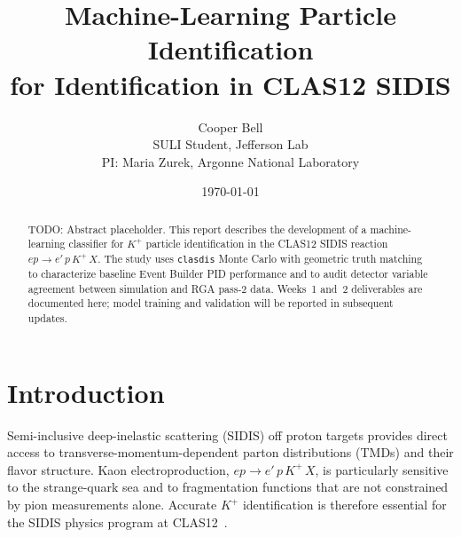 \documentclass[11pt]{article}
\title{Machine-Learning Particle Identification\\
       for \boldmath{$K^+$} Identification in CLAS12 SIDIS}
\author{Cooper Bell \\
  \small{SULI Student, Jefferson Lab} \\[2pt]
  \small{PI: Maria Zurek, Argonne National Laboratory}}
\date{\today}
\newcommand{\Kp}{K^{+}}
\newcommand{\epKX}{ep \to e'\,p\,\Kp\,X}
\begin{document}
\maketitle

\begin{abstract}
TODO: Abstract placeholder. This report describes the development of a
machine-learning classifier for $\Kp$ particle identification in the
CLAS12 SIDIS reaction $\epKX$.
The study uses \texttt{clasdis} Monte Carlo with geometric truth matching
to characterize baseline Event Builder PID performance and to audit detector
variable agreement between simulation and RGA pass-2 data.
Weeks~1 and~2 deliverables are documented here; model training and
validation will be reported in subsequent updates.
\end{abstract}

\section{Introduction}
\label{sec:intro}

Semi-inclusive deep-inelastic scattering (SIDIS) off proton targets
provides direct access to transverse-momentum-dependent parton distributions
(TMDs) and their flavor structure.
Kaon electroproduction, $\epKX$, is particularly sensitive to the
strange-quark sea and to fragmentation functions that are not constrained by
pion measurements alone.
Accurate $\Kp$ identification is therefore essential for the SIDIS physics
program at CLAS12~\cite{Burkert2020}.
\end{document}
